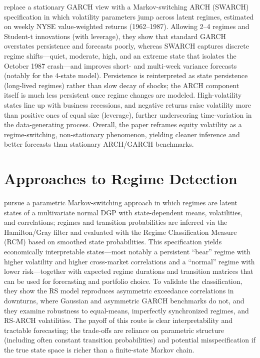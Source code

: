 \cite{HAMILTON1994307}replace a stationary GARCH view with a Markov-switching ARCH (SWARCH) specification in which volatility parameters jump across latent regimes, estimated on weekly NYSE value-weighted returns (1962–1987). Allowing 2–4 regimes and Student-t innovations (with leverage), they show that standard GARCH overstates persistence and forecasts poorly, whereas SWARCH captures discrete regime shifts—quiet, moderate, high, and an extreme state that isolates the October 1987 crash—and improves short- and multi-week variance forecasts (notably for the 4-state model). Persistence is reinterpreted as state persistence (long-lived regimes) rather than slow decay of shocks; the ARCH component itself is much less persistent once regime changes are modeled. High-volatility states line up with business recessions, and negative returns raise volatility more than positive ones of equal size (leverage), further underscoring time-variation in the data-generating process. Overall, the paper reframes equity volatility as a regime-switching, non-stationary phenomenon, yielding cleaner inference and better forecasts than stationary ARCH/GARCH benchmarks.



\section{Approaches to Regime Detection}

\cite{10.1093/rfs/15.4.1137} pursue a parametric Markov-switching approach in which regimes are latent states of a multivariate normal DGP with state-dependent means, volatilities, and correlations; regimes and transition probabilities are inferred via the Hamilton/Gray filter and evaluated with the Regime Classification Measure (RCM) based on smoothed state probabilities. This specification yields economically interpretable states—most notably a persistent “bear” regime with higher volatility and higher cross-market correlations and a “normal” regime with lower risk—together with expected regime durations and transition matrices that can be used for forecasting and portfolio choice. To validate the classification, they show the RS model reproduces asymmetric exceedance correlations in downturns, where Gaussian and asymmetric GARCH benchmarks do not, and they examine robustness to equal-means, imperfectly synchronized regimes, and RS-ARCH volatilities. The payoff of this route is clear interpretability and tractable forecasting; the trade-offs are reliance on parametric structure (including often constant transition probabilities) and potential misspecification if the true state space is richer than a finite-state Markov chain.

